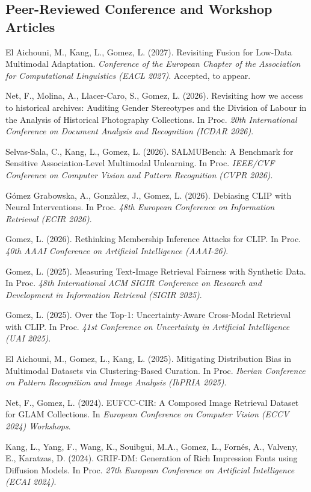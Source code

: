 \documentclass[11pt]{article}
\newcommand{\venue}[1]{\textit{#1}}
\begin{document}
\subsection*{Peer-Reviewed Conference and Workshop Articles}
\begin{pubs}
\item El Aichouni, M., Kang, L., Gomez, L. (2027). Revisiting Fusion for Low-Data Multimodal Adaptation. \venue{Conference of the European Chapter of the Association for Computational Linguistics (EACL 2027)}. Accepted, to appear.
\item Net, F., Molina, A., Llacer-Caro, S., Gomez, L. (2026). Revisiting how we access to historical archives: Auditing Gender Stereotypes and the Division of Labour in the Analysis of Historical Photography Collections. In Proc. \venue{20th International Conference on Document Analysis and Recognition (ICDAR 2026)}.
\item Selvas-Sala, C., Kang, L., Gomez, L. (2026). SALMUBench: A Benchmark for Sensitive Association-Level Multimodal Unlearning. In Proc. \venue{IEEE/CVF Conference on Computer Vision and Pattern Recognition (CVPR 2026)}.
\item Gómez Grabowska, A., Gonzàlez, J., Gomez, L. (2026). Debiasing CLIP with Neural Interventions. In Proc. \venue{48th European Conference on Information Retrieval (ECIR 2026)}.
\item Gomez, L. (2026). Rethinking Membership Inference Attacks for CLIP. In Proc. \venue{40th AAAI Conference on Artificial Intelligence (AAAI-26)}.
\item Gomez, L. (2025). Measuring Text-Image Retrieval Fairness with Synthetic Data. In Proc. \venue{48th International ACM SIGIR Conference on Research and Development in Information Retrieval (SIGIR 2025)}.
\item Gomez, L. (2025). Over the Top-1: Uncertainty-Aware Cross-Modal Retrieval with CLIP. In Proc. \venue{41st Conference on Uncertainty in Artificial Intelligence (UAI 2025)}.
\item El Aichouni, M., Gomez, L., Kang, L. (2025). Mitigating Distribution Bias in Multimodal Datasets via Clustering-Based Curation. In Proc. \venue{Iberian Conference on Pattern Recognition and Image Analysis (IbPRIA 2025)}.
\item Net, F., Gomez, L. (2024). EUFCC-CIR: A Composed Image Retrieval Dataset for GLAM Collections. In \venue{European Conference on Computer Vision (ECCV 2024) Workshops}.
\item Kang, L., Yang, F., Wang, K., Souibgui, M.A., Gomez, L., Fornés, A., Valveny, E., Karatzas, D. (2024). GRIF-DM: Generation of Rich Impression Fonts using Diffusion Models. In Proc. \venue{27th European Conference on Artificial Intelligence (ECAI 2024)}.

\end{pubs}
\end{document}
